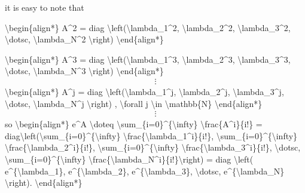 \documentclass[letterpaper,10pt,english]{jupyterBook}
\begin{document}
\sphinxAtStartPar
it is easy to note that

\sphinxAtStartPar
\textbackslash{}begin\{align*\}
A\textasciicircum{}2 = diag \textbackslash{}left(\textbackslash{}lambda\_1\textasciicircum{}2, \textbackslash{}lambda\_2\textasciicircum{}2, \textbackslash{}lambda\_3\textasciicircum{}2, \textbackslash{}dotsc, \textbackslash{}lambda\_N\textasciicircum{}2 \textbackslash{}right)
\textbackslash{}end\{align*\}

\sphinxAtStartPar
\textbackslash{}begin\{align*\}
A\textasciicircum{}3 = diag \textbackslash{}left(\textbackslash{}lambda\_1\textasciicircum{}3, \textbackslash{}lambda\_2\textasciicircum{}3, \textbackslash{}lambda\_3\textasciicircum{}3, \textbackslash{}dotsc, \textbackslash{}lambda\_N\textasciicircum{}3 \textbackslash{}right)
\textbackslash{}end\{align*\}
\begin{equation*}
\begin{split}
\vdots
\end{split}
\end{equation*}
\sphinxAtStartPar
\textbackslash{}begin\{align*\}
A\textasciicircum{}j = diag \textbackslash{}left(\textbackslash{}lambda\_1\textasciicircum{}j, \textbackslash{}lambda\_2\textasciicircum{}j, \textbackslash{}lambda\_3\textasciicircum{}j, \textbackslash{}dotsc, \textbackslash{}lambda\_N\textasciicircum{}j \textbackslash{}right) , \textbackslash{}forall j \textbackslash{}in \textbackslash{}mathbb\{N\}
\textbackslash{}end\{align*\}
\begin{equation*}
\begin{split}
\vdots
\end{split}
\end{equation*}
\sphinxAtStartPar
so
\textbackslash{}begin\{align*\}
e\textasciicircum{}A \textbackslash{}doteq \textbackslash{}sum\_\{i=0\}\textasciicircum{}\{\textbackslash{}infty\} \textbackslash{}frac\{A\textasciicircum{}i\}\{i!\} = diag\textbackslash{}left(\textbackslash{}sum\_\{i=0\}\textasciicircum{}\{\textbackslash{}infty\} \textbackslash{}frac\{\textbackslash{}lambda\_1\textasciicircum{}i\}\{i!\}, \textbackslash{}sum\_\{i=0\}\textasciicircum{}\{\textbackslash{}infty\} \textbackslash{}frac\{\textbackslash{}lambda\_2\textasciicircum{}i\}\{i!\}, \textbackslash{}sum\_\{i=0\}\textasciicircum{}\{\textbackslash{}infty\} \textbackslash{}frac\{\textbackslash{}lambda\_3\textasciicircum{}i\}\{i!\}, \textbackslash{}dotsc, \textbackslash{}sum\_\{i=0\}\textasciicircum{}\{\textbackslash{}infty\} \textbackslash{}frac\{\textbackslash{}lambda\_N\textasciicircum{}i\}\{i!\}\textbackslash{}right) = diag \textbackslash{}left( e\textasciicircum{}\{\textbackslash{}lambda\_1\}, e\textasciicircum{}\{\textbackslash{}lambda\_2\}, e\textasciicircum{}\{\textbackslash{}lambda\_3\}, \textbackslash{}dotsc, e\textasciicircum{}\{\textbackslash{}lambda\_N\} \textbackslash{}right).
\textbackslash{}end\{align*\}
\end{document}
